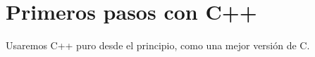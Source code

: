 \chapter{Primeros pasos con C++}


Usaremos C++ puro desde el principio, como una mejor versión de C.

% 

